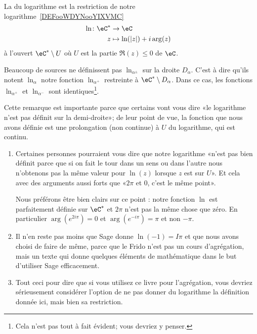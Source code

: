 \begin{definition}
    La  du logarithme est la restriction de notre logarithme~\ref{DEFooWDYNooYIXVMC}
    \begin{equation}
        \begin{aligned}
            \ln\colon \eC^*&\to \eC \\
            z&\mapsto \ln(| z |)+i\arg(z)
        \end{aligned}
    \end{equation}
    à l'ouvert \( \eC^*\setminus U\) où \( U\) est la partie \( \Re(z)\leq 0\) de \( \eC\).
\end{definition}

\begin{remark}      \label{REMooFBLLooDnkmjR}
    Beaucoup de sources\cite{ooGUROooApafph} ne définissent pas \( \ln_{\alpha^{\pm}}\) sur la droite \( D_{\alpha}\). C'est à dire qu'ils notent \( \ln_{\alpha}\) notre fonction \( \ln_{\alpha^+}\) restreinte à \( \eC^*\setminus D_{\alpha}\). Dans ce cas, les fonctions \( \ln_{\alpha^+}\) et \( \ln_{\alpha^-}\) sont identiques\footnote{Cela n'est pas tout à fait évident; vous devriez y penser.}.

    Cette remarque est importante parce que certains vont vous dire «le logarithme n'est pas définit sur la demi-droite»; de leur point de vue, la fonction que nous avons définie est une prolongation (non continue) à \( U\) du logarithme, qui est continu.

    \begin{enumerate}
        \item
            Certaines personnes pourraient vous dire que notre logarithme «n'est pas bien définit parce que si on fait le tour dans un sens ou dans l'autre nous n'obtenons pas la même valeur pour \( \ln(z)\) lorsque \( z\) est sur \( U\)». Et cela avec des arguments aussi forts que «\( 2\pi\) et \( 0\), c'est le même point».

            Nous préférons être bien clairs sur ce point : notre fonction \( \ln\) est parfaitement définie sur \( \eC^*\) et \( 2\pi\) n'est pas la même chose que zéro. En particulier \( \arg( e^{2i\pi})=0\) et \(  \arg(e^{-i\pi})=\pi\) et non \( -\pi\).
        \item
            Il n'en reste pas moins que Sage donne \( \ln(-1)=I\pi\) et que nous avons choisi de faire de même, parce que le Frido n'est pas un cours d'agrégation, mais un texte qui donne quelques éléments de mathématique dans le but d'utiliser Sage efficacement.
        \item
            Tout ceci pour dire que si vous utilisez ce livre pour l'agrégation, vous devriez sérieusement considérer l'option de ne pas donner du logarithme la définition donnée ici, mais bien sa restriction.
    \end{enumerate}


\end{remark}
